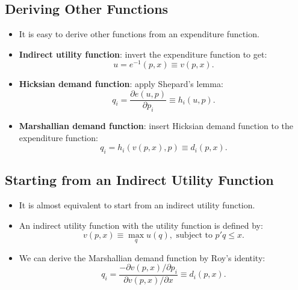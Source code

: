 \documentclass[
]{book}
\providecommand{\tightlist}{%
  \setlength{\itemsep}{0pt}\setlength{\parskip}{0pt}}
\begin{document}
\hypertarget{deriving-other-functions}{%
\subsection{Deriving Other Functions}\label{deriving-other-functions}}

\begin{itemize}
\tightlist
\item
  It is easy to derive other functions from an expenditure function.
\item
  \textbf{Indirect utility function}: invert the expenditure function to get:
  \begin{equation}
  u = e^{-1}(p, x) \equiv v(p, x).
  \end{equation}
\item
  \textbf{Hicksian demand function}: apply Shepard's lemma:
  \begin{equation}
  q_i = \frac{\partial e(u, p)}{\partial p_i} \equiv h_i(u, p).
  \end{equation}
\item
  \textbf{Marshallian demand function}: insert Hicksian demand function to the expenditure function:
  \begin{equation}
  q_i = h_i(v(p, x), p) \equiv d_i(p, x).
  \end{equation}
\end{itemize}

\hypertarget{starting-from-an-indirect-utility-function}{%
\subsection{Starting from an Indirect Utility Function}\label{starting-from-an-indirect-utility-function}}

\begin{itemize}
\tightlist
\item
  It is almost equivalent to start from an indirect utility function.
\item
  An indirect utility function with the utility function is defined by:
  \begin{equation}
  v(p, x) \equiv \max_{q} u(q), \text{ subject to } p'q \le x.
  \end{equation}
\item
  We can derive the Marshallian demand function by Roy's identity:
  \begin{equation}
  q_i = \frac{- \partial v(p, x)/\partial p_i}{\partial v(p, x)/\partial x} \equiv d_i(p, x).
  \end{equation}
\end{itemize}
\end{document}
